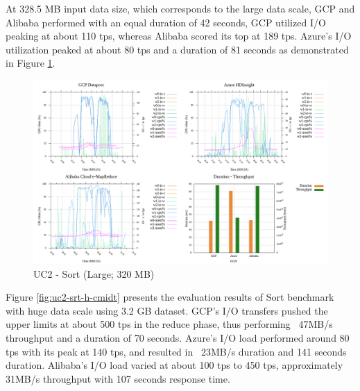 \documentclass[review]{elsarticle}
\begin{document}
	At 328.5 MB input data size, which corresponds to the large data scale, GCP and Alibaba performed with an equal duration of 42 seconds, GCP utilized I/O peaking at about 110 tps, whereas Alibaba scored its top at 189 tps. Azure's I/O utilization peaked at about 80 tps and a duration of 81 seconds as demonstrated in Figure \ref{fig:uc2-srt-l-cmidt}. 
	
	\begin{figure}[p]
		\caption{UC2 - Sort (Large; 320 MB)}
		\label{fig:uc2-srt-l-cmidt}
		\includegraphics[width=\textwidth]{uc2-srt-l-cmidt}
		\centering
	\end{figure}
	
	
	Figure \ref{fig:uc2-srt-h-cmidt} presents the evaluation results of Sort benchmark with huge data scale using 3.2 GB dataset.  GCP's I/O transfers pushed the upper limits at about 500 tps in the reduce phase, thus performing ~47MB/s throughput and a duration of 70 seconds. Azure's I/O load performed around 80 tps with its peak at 140 tps, and resulted in ~23MB/s duration and 141 seconds duration. Alibaba's I/O load varied at about 100 tps to 450 tps, approximately 31MB/s throughput with 107 seconds response time. 
	
\end{document}
